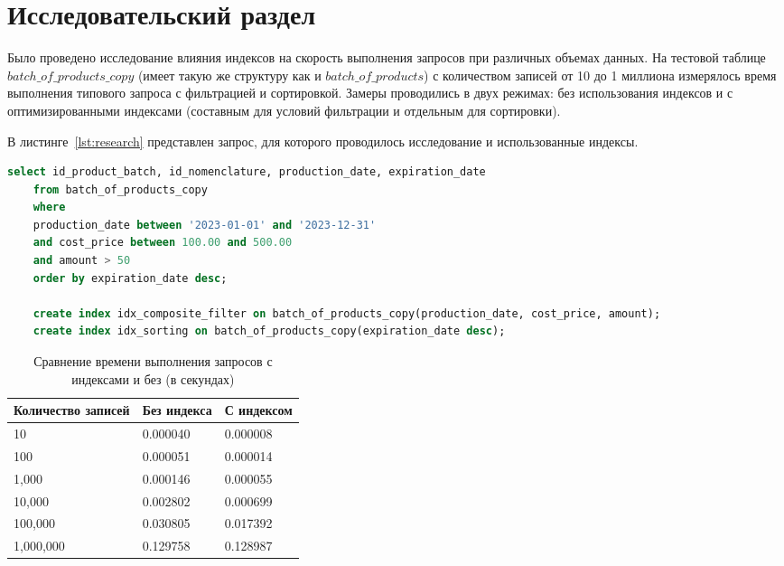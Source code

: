 \chapter{Исследовательский раздел}
Было проведено исследование влияния индексов на скорость выполнения запросов при различных объемах данных. На тестовой таблице $batch\_of\_products\_copy$ (имеет такую же структуру как и $batch\_of\_products$) с количеством записей от 10 до 1 миллиона измерялось время выполнения типового запроса с фильтрацией и сортировкой. Замеры проводились в двух режимах: без использования индексов и с оптимизированными индексами (составным для условий фильтрации и отдельным для сортировки).

В листинге~\ref{lst:research} представлен запрос, для которого проводилось исследование и использованные индексы.
\begin{lstlisting}[label=lst:research, caption=Запрос и индексы, language=SQL]
	select id_product_batch, id_nomenclature, production_date, expiration_date
	from batch_of_products_copy
	where 
	production_date between '2023-01-01' and '2023-12-31'
	and cost_price between 100.00 and 500.00
	and amount > 50
	order by expiration_date desc;
	
	create index idx_composite_filter on batch_of_products_copy(production_date, cost_price, amount);
	create index idx_sorting on batch_of_products_copy(expiration_date desc);
\end{lstlisting}

\begin{table}[h]
	\centering
	\caption{Сравнение времени выполнения запросов с индексами и без (в секундах)}
	\label{tab:query_performance}
	\begin{tabular}{|p{3cm}|p{3cm}|p{4cm}|}
		\hline
		\textbf{Количество записей} & \textbf{Без индекса} & \textbf{С индексом} \\
		\hline
		10 & 0.000040 & 0.000008 \\
		\hline
		100 & 0.000051 & 0.000014 \\
		\hline
		1,000 & 0.000146 & 0.000055 \\
		\hline
		10,000 & 0.002802 & 0.000699 \\
		\hline
		100,000 & 0.030805 & 0.017392 \\
		\hline
		1,000,000 & 0.129758 & 0.128987 \\
		\hline
	\end{tabular}
\end{table}